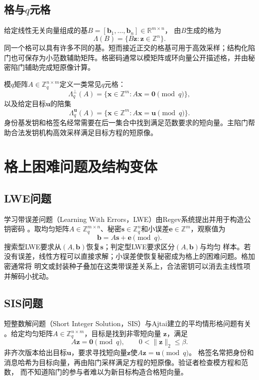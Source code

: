 \subsection{格与$q$元格}

给定线性无关向量组成的基$B=[\mathbf b_1,\ldots,\mathbf b_n]\in\mathbb R^{m\times n}$，
由$B$生成的格为
\[
  \Lambda(B)=\{B\mathbf z:\mathbf z\in\mathbb Z^n\}.
\]
同一个格可以具有许多不同的基。短而接近正交的格基可用于高效采样；结构化陷门也可保存为小范数辅助矩阵。格密码通常以模矩阵或环向量公开描述格，并由秘密陷门辅助完成短原像计算。

模$q$矩阵$A\in\mathbb Z_q^{n\times m}$定义一类常见$q$元格：
\[
 \Lambda_q^\perp(A)=\{\mathbf x\in\mathbb Z^m:A\mathbf x=\mathbf0\pmod q\},
\]
以及给定目标$\mathbf u$的陪集
\[
 \Lambda_q^{\mathbf u}(A)=\{\mathbf x\in\mathbb Z^m:A\mathbf x=\mathbf u\pmod q\}.
\]
身份基发钥和格签名经常需要在后一集合中找到满足范数要求的短向量。主陷门帮助合法发钥机构高效采样满足目标方程的短原像。

\section{格上困难问题及结构变体}

\subsection{LWE问题}

学习带误差问题（Learning With Errors，LWE）由Regev系统提出并用于构造公钥密码
\cite{regev2005lwe}。取均匀矩阵$A\in\mathbb Z_q^{m\times n}$、秘密$\mathbf s\in\mathbb
Z_q^n$和小误差$\mathbf e\in\mathbb Z^m$，观察值为
\[
  \mathbf b=A\mathbf s+\mathbf e\pmod q.
\]
搜索型LWE要求从$(A,\mathbf b)$恢复$\mathbf s$；判定型LWE要求区分$(A,\mathbf b)$与均匀
样本。若没有误差，线性方程可以直接求解；小误差使恢复秘密成为格上的困难问题。格加密通常将
明文或封装种子叠加在这类带误差关系上，合法密钥可以消去主线性项并解码小扰动。

\subsection{SIS问题}

短整数解问题（Short Integer Solution，SIS）与Ajtai建立的平均情形格问题有关
\cite{ajtai1996}。给定均匀矩阵$A\in\mathbb Z_q^{n\times m}$，目标是找到非零短向量
$\mathbf z$，满足
\[
 A\mathbf z=\mathbf0\pmod q,
 \qquad 0<\lVert\mathbf z\rVert_2\leq\beta.
\]
非齐次版本给出目标$\mathbf u$，要求寻找短向量$\mathbf z$使$A\mathbf z=\mathbf u\pmod q$。
格签名常把身份和消息哈希为目标向量，再由陷门采样满足方程的短原像。验证者检查模方程和范数，
而不知道陷门的参与者难以为新目标构造合格短向量。

